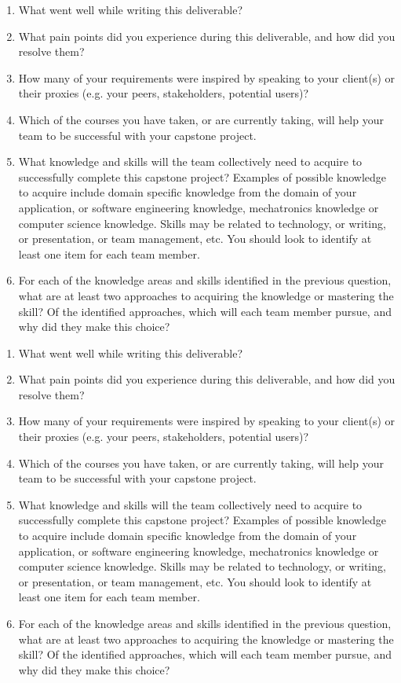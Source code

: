 \begin{enumerate}
  \item What went well while writing this deliverable? 
  \item What pain points did you experience during this deliverable, and how did
  you resolve them?
  \item How many of your requirements were inspired by speaking to your
  client(s) or their proxies (e.g. your peers, stakeholders, potential users)?
  \item Which of the courses you have taken, or are currently taking, will help
  your team to be successful with your capstone project.
  \item What knowledge and skills will the team collectively need to acquire to
  successfully complete this capstone project?  Examples of possible knowledge
  to acquire include domain specific knowledge from the domain of your
  application, or software engineering knowledge, mechatronics knowledge or
  computer science knowledge.  Skills may be related to technology, or writing,
  or presentation, or team management, etc.  You should look to identify at
  least one item for each team member.
  \item For each of the knowledge areas and skills identified in the previous
  question, what are at least two approaches to acquiring the knowledge or
  mastering the skill?  Of the identified approaches, which will each team
  member pursue, and why did they make this choice?
\end{enumerate}

\begin{enumerate}
  \item What went well while writing this deliverable? 
  \item What pain points did you experience during this deliverable, and how did
  you resolve them?
  \item How many of your requirements were inspired by speaking to your
  client(s) or their proxies (e.g. your peers, stakeholders, potential users)?
  \item Which of the courses you have taken, or are currently taking, will help
  your team to be successful with your capstone project.
  \item What knowledge and skills will the team collectively need to acquire to
  successfully complete this capstone project?  Examples of possible knowledge
  to acquire include domain specific knowledge from the domain of your
  application, or software engineering knowledge, mechatronics knowledge or
  computer science knowledge.  Skills may be related to technology, or writing,
  or presentation, or team management, etc.  You should look to identify at
  least one item for each team member.
  \item For each of the knowledge areas and skills identified in the previous
  question, what are at least two approaches to acquiring the knowledge or
  mastering the skill?  Of the identified approaches, which will each team
  member pursue, and why did they make this choice?
\end{enumerate}
